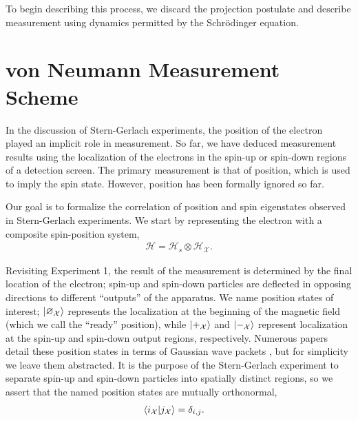 To begin describing this process, we discard the projection postulate and describe measurement using dynamics permitted by the Schrödinger equation.
%

\section{von Neumann Measurement Scheme} \label{vnms}
In the discussion of Stern-Gerlach experiments, the position of the electron played an implicit role in measurement. So far, we have deduced measurement results using the localization of the electrons in the spin-up or spin-down regions of a detection screen. The primary measurement is that of position, which is used to imply the spin state. However, position has been formally ignored so far.

Our goal is to formalize the correlation of position and spin eigenstates observed in Stern-Gerlach experiments. We start by representing the electron with a composite spin-position system,
\begin{align}
  \mathcal{H} = \mathcal{H}_s \otimes \mathcal{H}_\mathcal{X}.
\end{align}

Revisiting Experiment 1, the result of the measurement is determined by the final location of the electron; spin-up and spin-down particles are deflected in opposing directions to different ``outputs'' of the apparatus. We name position states of interest; $\ket{\varnothing_\mathcal{X}}$ represents the localization at the beginning of the magnetic field (which we call the ``ready'' position), while $\ket{+_{\mathcal{X}}}$ and $\ket{-_{\mathcal{X}}}$ represent localization at the spin-up and spin-down output regions, respectively. Numerous papers detail these position states in terms of Gaussian wave packets \cite{Venugopalan}, but for simplicity we leave them abstracted. It is the purpose of the Stern-Gerlach experiment to separate spin-up and spin-down particles into spatially distinct regions, so we assert that the named position states are mutually orthonormal,
\begin{align}
  \braket{i_\mathcal{X}| j_\mathcal{X}} &= \delta_{i,j}.
\end{align}

